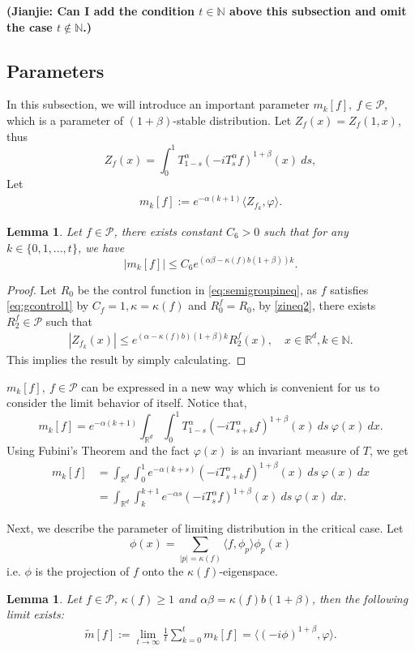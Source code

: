 \documentclass[12pt, a4paper]{amsart}
\newtheorem{lem}[thm]{Lemma}
\theoremstyle{definition}
\numberwithin{equation}{section}
\begin{document}
{\bf (Jianjie: Can I add the condition $t\in \mathbb{N}$ above this subsection and omit the case $t \notin \mathbb{N}$.)}
\subsection{Parameters}
 In this subsection, we will introduce an important parameter $m_k[f],~f\in\mathcal{P}$, which is a parameter of $(1+\beta)$-stable distribution. Let $Z_f(x)=Z_f(1,x)$, thus
 $$Z_f(x)=\int_0^1 T^{\alpha}_{1-s}(-iT_s^{\alpha}f)^{1+\beta}(x)~ds,$$
 Let
 \begin{align}
      m_k[f]:=e^{-\alpha(k+1)}\langle Z_{f_k},\varphi\rangle.
 \end{align}
\begin{lem}\label{mgineq1}
Let $f\in\mathcal{P}$, there exists constant $C_6>0$ such that for any $k\in \{0,1,...,t\}$, we have
$$|m_k[f]|\leq C_6 e^{(\alpha\beta-\kappa(f)b(1+\beta))k}.$$
\end{lem}
\begin{proof}
Let $R_0$ be the control function in \eqref{eq:semigroupineq}, as $f$ satisfies \eqref{eq:gcontrol1} by $C_f=1, \kappa=\kappa(f)$ and $R_0^f=R_0$, by \eqref{zineq2}, there exists $R_2^f\in \mathcal{P}$ such that 
\begin{align}
    |Z_{f_k}(x)|\leq e^{(\alpha-\kappa(f)b)(1+\beta)k}R_2^f(x), \quad x\in \mathbb{R}^d, k\in\mathbb{N}.
\end{align}
This implies the result by simply calculating.
\end{proof}

$m_k[f],~f\in \mathcal{P}$ can be expressed in a new way which is convenient for us to consider the limit behavior of itself. Notice that,
$$m_k[f]=e^{-\alpha(k+1)}\int_{\mathbb{R}^d}\int_0^1 T_{1-s}^{\alpha}(-iT_{s+k}^{\alpha}f)^{1+\beta}(x)~ds~\varphi(x)~dx.$$
Using Fubini's Theorem and the fact $\varphi(x)$ is an invariant measure of $T$, we get
\begin{align}
    m_k[f]&=\int_{\mathbb{R}^d}\int_0^1 e^{-\alpha(k+s)}(-iT_{s+k}^{\alpha}f)^{1+\beta}(x)~ds~\varphi(x)~dx\nonumber\\
    &=\int_{\mathbb{R}^d}\int_k^{k+1} e^{-\alpha s}(-iT_{s}^{\alpha}f)^{1+\beta}(x)~ds~\varphi(x)~dx.\label{mkeq}
\end{align}

Next, we describe the parameter of limiting distribution in the critical case. Let
$$\phi(x)=\sum_{|p|=\kappa(f)}\langle f, \phi_p\rangle\phi_p(x)$$
i.e. $\phi$ is the projection of $f$ onto the $\kappa(f)$-eigenspace.
\begin{lem}\label{lemma210}
Let $f \in \mathcal{P}$, $\kappa(f)\geq 1$ and $\alpha\beta=\kappa(f)b(1+\beta)$, then the following limit exists:
\begin{align}
    \tilde{m}[f]:=\lim_{t\rightarrow \infty}\frac{1}{t}\sum_{k=0}^{t}m_k[f]=\langle(-i\phi)^{1+\beta},\varphi\rangle.
\end{align}
\end{lem}
\end{document}
